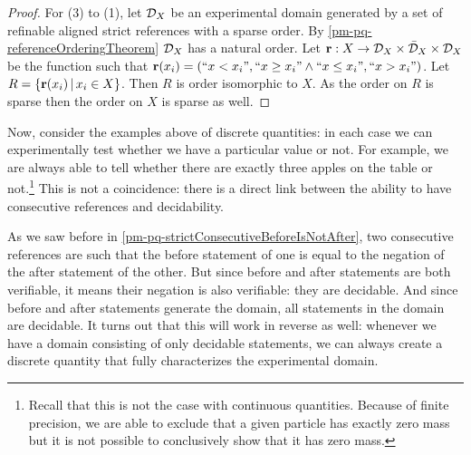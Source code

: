 \begin{mathSection}
\begin{proof}
		For (3) to (1), let $\mathcal{D}_X$ be an experimental domain generated by a set of refinable aligned strict references with a sparse order. By \ref{pm-pq-referenceOrderingTheorem} $\mathcal{D}_X$ has a natural order. Let $\textbf{r} : X \to \mathcal{D}_X \times \bar{\mathcal{D}}_X \times \mathcal{D}_X$ be the function such that $\textbf{r}(x_i) = (``x < x_i", ``x \geq x_i" \wedge ``x \leq x_i", ``x > x_i")$. Let $R=\{ \textbf{r}(x_i) \, | \, x_i \in X \}$. Then $R$ is order isomorphic to $X$. As the order on $R$ is sparse then the order on $X$ is sparse as well.
	\end{proof}
\end{mathSection}

Now, consider the examples above of discrete quantities: in each case we can experimentally test whether we have a particular value or not. For example, we are always able to tell whether there are exactly three apples on the table or not.\footnote{Recall that this is not the case with continuous quantities. Because of finite precision, we are able to exclude that a given particle has exactly zero mass but it is not possible to conclusively show that it has zero mass.} This is not a coincidence: there is a direct link between the ability to have consecutive references and decidability.

As we saw before in \ref{pm-pq-strictConsecutiveBeforeIsNotAfter}, two consecutive references are such that the before statement of one is equal to the negation of the after statement of the other. But since before and after statements are both verifiable, it means their negation is also verifiable: they are decidable. And since before and after statements generate the domain, all statements in the domain are decidable. It turns out that this will work in reverse as well: whenever we have a domain consisting of only decidable statements, we can always create a discrete quantity that fully characterizes the experimental domain.


